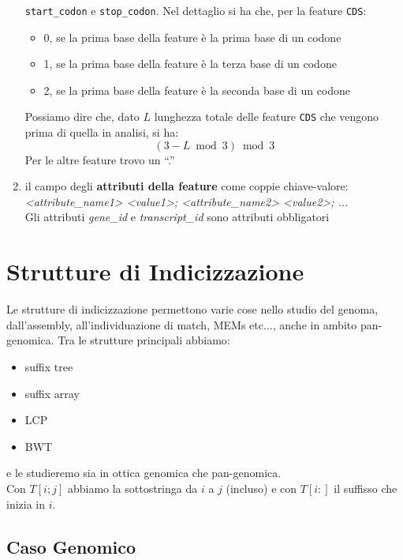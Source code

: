 \documentclass[a4paper,12pt, oneside]{book}
\begin{document}
\begin{enumerate}
  \texttt{start\_codon} e \texttt{stop\_codon}. Nel dettaglio si ha che, per la
  feature \texttt{CDS}:
  \begin{itemize}
    \item 0, se la prima base della feature è la prima base di un codone 
    \item 1, se la prima base della feature è la terza base di un codone
    \item 2, se la prima base della feature è la seconda base di un codone 
  \end{itemize}
  Possiamo dire che, dato $L$ lunghezza totale delle feature \texttt{CDS} che
  vengono prima di quella in analisi, si ha:
  \[(3-L\bmod 3)\bmod 3\]
  Per le altre feature trovo un ``.''
  \item il campo degli \textbf{attributi della feature} come coppie
  chiave-valore: \small{\textit{<attribute\_name1> <value1>; <attribute\_name2>
      <value2>; ...}}\\ 
  Gli attributi \textit{gene\_id} e \textit{transcript\_id} sono attributi
  obbligatori 
\end{enumerate}
\chapter{Strutture di Indicizzazione}
Le strutture di indicizzazione permettono varie cose nello studio del genoma,
dall'assembly, all'individuazione di match, MEMs etc$\ldots$, anche in ambito
pan-genomica. Tra le strutture principali abbiamo:
\begin{itemize}
  \item suffix tree
  \item suffix array
  \item LCP
  \item BWT
\end{itemize}
e le studieremo sia in ottica genomica che pan-genomica.\\
Con $T[i;j]$ abbiamo la sottostringa da $i$ a $j$ (incluso) e con $T[i:]$ il
suffisso che inizia in $i$.
\section{Caso Genomico}
\end{document}
